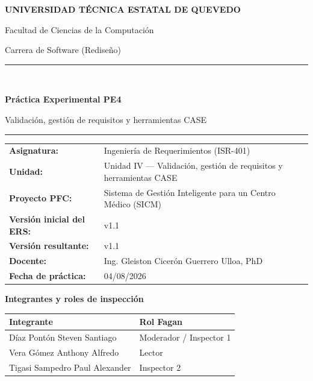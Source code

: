 \documentclass[11pt,a4paper]{article}
\newcommand{\sistema}{Sistema de Gestión Inteligente para un Centro Médico (SICM)}
\newcommand{\versioners}{1.1}
\newcommand{\versionbaseline}{v1.1}
\newcommand{\fechasesion}{04/08/2026}
\begin{document}
	
	\begin{titlepage}
		\centering
		{\large\bfseries UNIVERSIDAD TÉCNICA ESTATAL DE QUEVEDO\par}
		\vspace{0.25cm}
		{\large Facultad de Ciencias de la Computación\par}
		{\large Carrera de Software (Rediseño)\par}
		\vspace{.12cm}
		{\color{uteqblue}\rule{\textwidth}{1.4pt}}\\[0.6cm]
		{\Huge\bfseries Práctica Experimental PE4\par}
		\vspace{0.15cm}
		{\LARGE Validación, gestión de requisitos y herramientas CASE\par}
		\vspace{0.6cm}
		{\color{uteqblue}\rule{\textwidth}{1.4pt}}
		\vspace{0.9cm}
		
		\begin{tabularx}{\textwidth}{>{\bfseries}p{3.8cm}X}
			Asignatura: & Ingeniería de Requerimientos (ISR-401)\\
			Unidad: & Unidad IV --- Validación, gestión de requisitos y herramientas CASE\\
			Proyecto PFC: & \sistema\\
			Versión inicial del ERS: & v\versioners\\
			Versión resultante: & \versionbaseline\\
			Docente: & Ing. Gleiston Cicerón Guerrero Ulloa, PhD\\
			Fecha de práctica: & \fechasesion\\
		\end{tabularx}
		
		\vspace{0.8cm}
		{\large\bfseries Integrantes y roles de inspección\par}
		\vspace{0.25cm}
	
		\begin{tabularx}{\textwidth}{p{7.1cm}p{9.0cm}}
			\toprule
			\textbf{Integrante} & \textbf{Rol Fagan} \\
			\midrule
			Díaz Pontón Steven Santiago & Moderador / Inspector 1 \\
			Vera Gómez Anthony Alfredo & Lector \\
			Tigasi Sampedro Paul Alexander & Inspector 2 \\
			\bottomrule
		\end{tabularx}
		

\end{titlepage}
\end{document}
